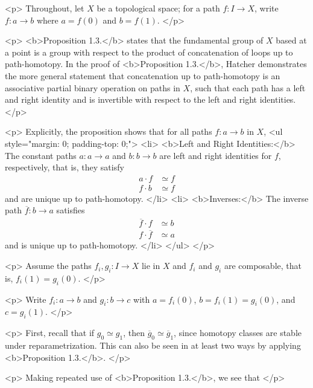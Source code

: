 <p>
    Throughout, let $X$ be a topological space; for a path $f : I \to X$, write $f : a \to b$ where $a = f(0)$ and $b = f(1)$.
</p>

<p>
    <b>Proposition 1.3.</b> states that the fundamental group of $X$ based at a point is a group with respect to the product of concatenation of loops up to path-homotopy. In the proof of <b>Proposition 1.3.</b>, Hatcher demonstrates the more general statement that concatenation up to path-homotopy is an associative partial binary operation on paths in $X$, such that each path has a left and right identity and is invertible with respect to the left and right identities.
</p>

<p>
    Explicitly, the proposition shows that for all paths $f : a \to b$ in $X$,
    <ul style="margin: 0; padding-top: 0;">
        <li>
            <b>Left and Right Identities:</b> The constant paths $a : a \to a$ and $b : b \to b$ are left and right identities for $f$, respectively, that is, they satisfy $$\begin{align*}a \cdot f &\simeq f \tag{left identity}\\ f \cdot b &\simeq f\tag{right identity}\end{align*}$$ and are unique up to path-homotopy.
        </li>
        <li>
            <b>Inverses:</b> The inverse path $\overline{f} : b \to a$ satisfies 
            $$\begin{align*}\overline{f} \cdot f &\simeq b \tag{left inverse}\\ f \cdot \overline{f} &\simeq a \tag{right inverse}\end{align*}$$ and is unique up to path-homotopy.
        </li>
    </ul>
</p>

<p>
    Assume the paths $f_i,g_i : I \to X$ lie in $X$ and $f_i$ and $g_i$ are
    composable, that is, $f_i(1) = g_i(0)$. 
</p>

<p>
    Write $f_i : a \to b$ and $g_i : b \to c$ with $a = f_i(0)$, $b = f_i(1) =
    g_i(0)$, and $c = g_i(1)$.
</p>

<p>
    First, recall that if $g_0 \simeq g_1$, then $\overline g_0 \simeq \overline g_1$, since homotopy classes are stable under reparametrization. This can also be seen in at least two ways by applying <b>Proposition 1.3.</b>. 
</p>

<p>
    Making repeated use of <b>Proposition 1.3.</b>, we see that
</p>

